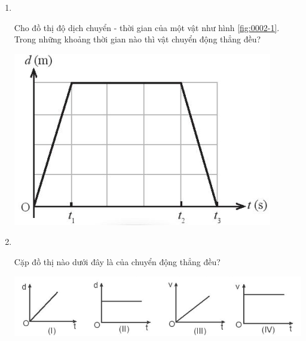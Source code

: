 \begin{enumerate}[label=\bfseries Câu \arabic*:,leftmargin=1.5cm]
{}

\item {}\\
{Cho đồ thị độ dịch chuyển - thời gian của một vật như hình \ref{fig:0002-1}. Trong những khoảng thời gian nào thì vật chuyển động thẳng đều?
	\begin{center}
		\includegraphics[width=0.3\linewidth]{../figs/VN10-2023-PH-TP0002-1}
		\label{fig:0002-1}
	\end{center}

}

\item {}\\
{Cặp đồ thị nào dưới đây là của chuyển động thẳng đều?
	\begin{center}
		\includegraphics[width=0.7\linewidth]{../figs/VN10-2023-PH-TP0002-9}
	\end{center}
}


\end{enumerate}
